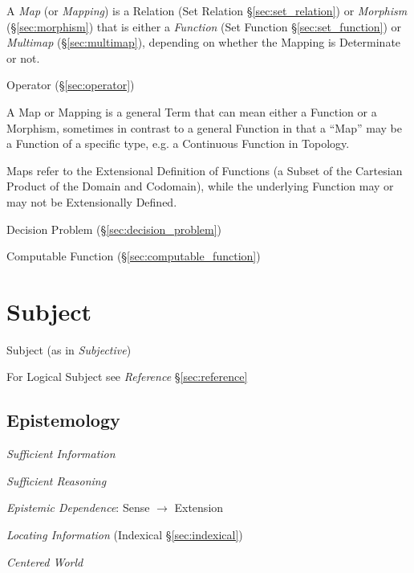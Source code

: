 A \emph{Map} (or \emph{Mapping}) is a Relation (Set Relation
\S\ref{sec:set_relation}) or \emph{Morphism} (\S\ref{sec:morphism})
that is either a \emph{Function} (Set Function
\S\ref{sec:set_function}) or \emph{Multimap} (\S\ref{sec:multimap}),
depending on whether the Mapping is Determinate or not.

Operator (\S\ref{sec:operator})

A Map or Mapping is a general Term that can mean either a Function or
a Morphism, sometimes in contrast to a general Function in that a
``Map'' may be a Function of a specific type, e.g. a Continuous
Function in Topology.

Maps refer to the Extensional Definition of Functions (a Subset of the
Cartesian Product of the Domain and Codomain), while the underlying
Function may or may not be Extensionally Defined.

Decision Problem (\S\ref{sec:decision_problem})

Computable Function (\S\ref{sec:computable_function})



\section{Subject}\label{sec:subject}

Subject (as in \emph{Subjective})

For Logical Subject see \emph{Reference} \S\ref{sec:reference}



\subsection{Epistemology}\label{sec:epistemology}
\cite{chalmers02}

\emph{Sufficient Information}

\emph{Sufficient Reasoning}

\emph{Epistemic Dependence}: Sense $\rightarrow$ Extension

\emph{Locating Information} (Indexical \S\ref{sec:indexical})

\emph{Centered World}




